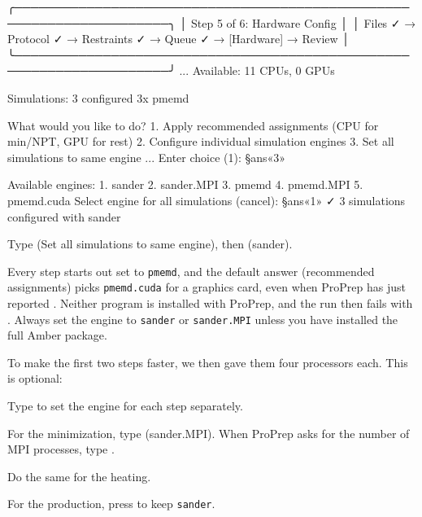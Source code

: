 \begin{screen}
╭─────────────────────────────────────────────────────────────────────╮
│ Step 5 of 6: Hardware Config                                        │
│ Files ✓ → Protocol ✓ → Restraints ✓ → Queue ✓ → [Hardware] → Review │
╰─────────────────────────────────────────────────────────────────────╯
...
  Available: 11 CPUs, 0 GPUs

  Simulations: 3 configured
    3x pmemd

What would you like to do?
   1. Apply recommended assignments (CPU for min/NPT, GPU for rest)
   2. Configure individual simulation engines
   3. Set all simulations to same engine
...
Enter choice (1): §ans«3»

Available engines:
  1. sander
  2. sander.MPI
  3. pmemd
  4. pmemd.MPI
  5. pmemd.cuda
Select engine for all simulations (cancel): §ans«1»
✓ 3 simulations configured with sander
\end{screen}

\begin{steps}
  \item Type  (Set all simulations to same engine), then 
        (sander).
\end{steps}

\begin{watchout}
Every step starts out set to \texttt{pmemd}, and the default answer
 (recommended assignments) picks \texttt{pmemd.cuda} for a graphics
card, even when ProPrep has just reported . Neither program is
installed with ProPrep, and the run then fails with . Always set the engine to \texttt{sander} or
\texttt{sander.MPI} unless you have installed the full Amber package.
\end{watchout}

To make the first two steps faster, we then gave them four processors each.
This is optional:

\begin{steps}[resume]
  \item Type  to set the engine for each step separately.
  \item For the minimization, type  (sander.MPI). When ProPrep asks
        for the number of MPI processes, type .
  \item Do the same for the heating.
  \item For the production, press  to keep \texttt{sander}.
\end{steps}

